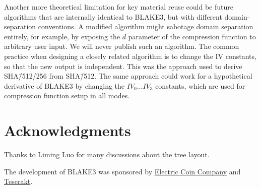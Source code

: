 \documentclass[11pt,notitlepage,a4paper]{article}
\begin{document}
Another more theoretical limitation for key material reuse could be future
algorithms that are internally identical to BLAKE3, but with different
domain-separation conventions. A modified algorithm might sabotage domain
separation entirely, for example, by exposing the $d$ parameter of the
compression function to arbitrary user input. We will never publish such an
algorithm. The common practice when designing a closely related algorithm is to
change the IV constants, so that the new output is independent. This was the
approach used to derive SHA\=/512/256 from SHA\=/512. The same approach could work
for a hypothetical derivative of BLAKE3 by changing the $IV_0 \ldots IV_3$
constants, which are used for compression function setup in all modes.

\section*{Acknowledgments}\label{sec:acknowledgments}

Thanks to Liming Luo for many discussions about the tree layout.

The development of BLAKE3 was sponsored by
\href{https://electriccoin.co/}{Electric Coin Company} and
\href{https://teserakt.io}{Teserakt}.




\end{document}
